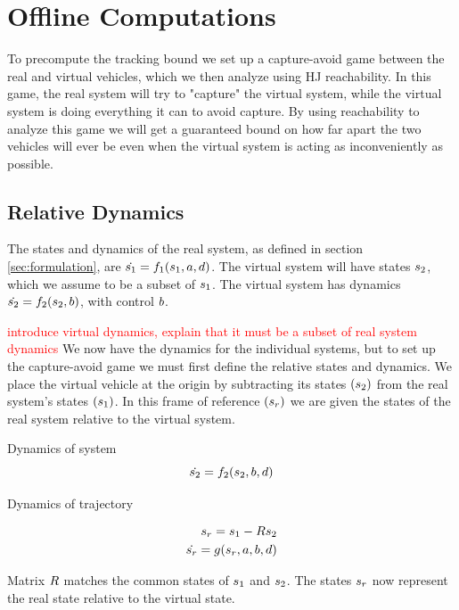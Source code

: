 \section{Offline Computations \label{sec:precomp}}

To precompute the tracking bound we set up a capture-avoid game between the real and virtual vehicles, which we then analyze using HJ reachability. In this game, the real system will try to "capture" the virtual system, while the virtual system is doing everything it can to avoid capture. By using reachability to analyze this game we will get a guaranteed bound on how far apart the two vehicles will ever be even when the virtual system is acting as inconveniently as possible.

\subsection{Relative Dynamics}
The states and dynamics of the real system, as defined in section \ref{sec:formulation}, are $\dot{s_1} = f_1(s_1, a, d)$. The virtual system will have states $s_2$, which we assume to be a subset of $s_1$. The virtual system has dynamics $\dot{s_2} = f_2(s_2, b)$, with control $b$.

\textcolor{red}{introduce virtual dynamics, explain that it must be a subset of real system dynamics}
We now have the dynamics for the individual systems, but to set up the capture-avoid game we must first define the relative states and dynamics. We place the virtual vehicle at the origin by subtracting its states $(s_2)$ from the real system's states $(s_1)$. In this frame of reference $(s_r)$ we are given the states of the real system relative to the virtual system. 

Dynamics of system
\begin{equation}
\dot{s_2} = f_2(s_2, b, d)
\end{equation}

Dynamics of trajectory

\begin{equation}
\begin{aligned}
s_r = s_1 - Rs_2\\
\dot{s_r} = g(s_r, a, b, d)
\end{aligned}
\end{equation}

Matrix $R$ matches the common states of $s_1$ and $s_2$. The states $s_r$ now represent the real state relative to the virtual state.

